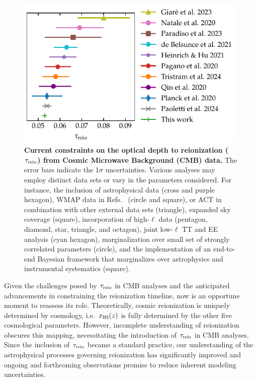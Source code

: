 \begin{figure}[tb]
\centering
\includegraphics{figs/tau_fig.pdf}
\caption{\textbf{Current constraints on the optical depth to
reionization ($\tau_{\mathrm{reio}}$) from Cosmic Microwave Background (CMB)
data.}
The error bars indicate the 1$\sigma$ uncertainties.
Various analyses may employ distinct data sets or vary in the parameters
considered.
For instance, the inclusion of astrophysical data \cite{Qin2020,Paoletti2024} 
(cross and purple hexagon), WMAP data in Refs.~ \cite{Natale2020,
Paradiso2023} (circle and square), or ACT in combination with other
external data sets \cite{Giare2023} (triangle), expanded sky coverage
\cite{Paradiso2023} (square), incorporation of high-$\ell$ data
\cite{Pagano2020, Planck2020a, HeinrichHu2021, Giare2023, Tristram2024} 
(pentagon, diamond, star, triangle, and octagon), joint low-$\ell$ TT and EE 
analysis \cite{deBelsunce2021} (cyan hexagon), marginalization over 
small set of strongly correlated parameters \cite{Natale2020} (circle), 
and the implementation of an end-to-end Bayesian framework that marginalizes 
over astrophysics and instrumental systematics \cite{Paradiso2023} (square).}
\label{fig:tau}
\end{figure}

Given the challenges posed by $\tau_{\mathrm{reio}}$ in CMB analyses and the
anticipated advancements in constraining the reionization 
timeline\cite{Montero2021, Hera2022}, now is an opportune
moment to reassess its role.
Theoretically, cosmic reionization is uniquely determined by
cosmology, i.e.\  $x_{\mathrm{HI}}(z)$ is fully determined by the other five cosmological
parameters. However, incomplete understanding of
reionization obscures this mapping, necessitating the introduction
of $\tau_{\mathrm{reio}}$ in CMB analyses. Since the inclusion of 
$\tau_{\mathrm{reio}}$ became a standard practice, 
our understanding of the astrophysical 
processes governing reionization has significantly 
improved\cite{Gnedin2022, Kannan2022,Murray2020, Fan2023}  
and ongoing and forthcoming observations promise to reduce inherent
modeling uncertainties.

